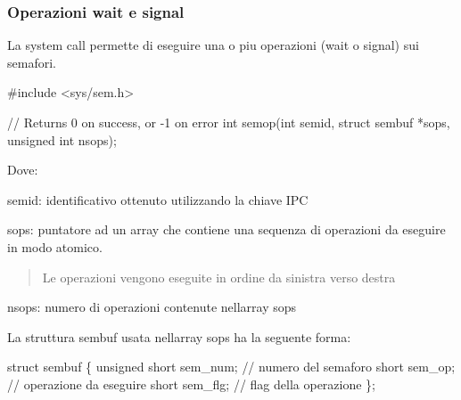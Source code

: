\subsubsection*{Operazioni wait e signal}

La system call permette di eseguire una o piu\textquotesingle{} operazioni (wait o signal) sui semafori.


\begin{DoxyCode}
\textcolor{preprocessor}{#include <sys/sem.h>}

\textcolor{comment}{// Returns 0 on success, or -1 on error}
\textcolor{keywordtype}{int} semop(\textcolor{keywordtype}{int} semid, \textcolor{keyword}{struct} sembuf *sops, \textcolor{keywordtype}{unsigned} \textcolor{keywordtype}{int} nsops);
\end{DoxyCode}


Dove\+:
\begin{DoxyItemize}
\item {\ttfamily semid}\+: identificativo ottenuto utilizzando la chiave I\+PC
\item {\ttfamily sops}\+: puntatore ad un array che contiene una sequenza di operazioni da eseguire in modo atomico. \begin{quote}
Le operazioni vengono eseguite in ordine da sinistra verso destra \end{quote}

\item {\ttfamily nsops}\+: numero di operazioni contenute nell\textquotesingle{}array {\ttfamily sops}
\end{DoxyItemize}

La struttura {\ttfamily sembuf} usata nell\textquotesingle{}array {\ttfamily sops} ha la seguente forma\+: 
\begin{DoxyCode}
\textcolor{keyword}{struct }sembuf \{
    \textcolor{keywordtype}{unsigned} \textcolor{keywordtype}{short} sem\_num; \textcolor{comment}{// numero del semaforo}
    \textcolor{keywordtype}{short} sem\_op;  \textcolor{comment}{// operazione da eseguire}
    \textcolor{keywordtype}{short} sem\_flg; \textcolor{comment}{// flag della operazione}
\};
\end{DoxyCode}


